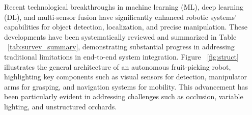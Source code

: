 \documentclass{ieeeaccess}
\begin{document}
Recent technological breakthroughs in machine learning (ML), deep learning (DL), and multi-sensor fusion have significantly enhanced robotic systems' capabilities for object detection, localization, and precise manipulation. These developments have been systematically reviewed and summarized in Table ~\ref{tab:survey_summary}, demonstrating substantial progress in addressing traditional limitations in end-to-end system integration.
 Figure ~\ref{fig:struct} illustrates the general architecture of an autonomous fruit-picking robot, highlighting key components such as visual sensors for detection, manipulator arms for grasping, and navigation systems for mobility. This advancement has been particularly evident in addressing challenges such as occlusion, variable lighting, and unstructured orchards.
\end{document}
